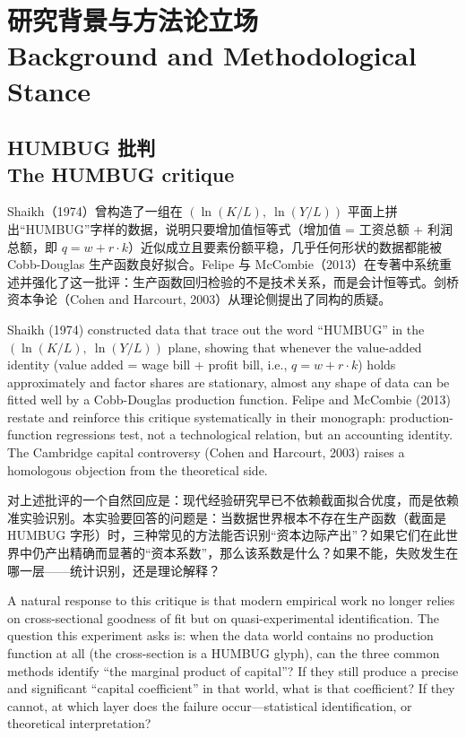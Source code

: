 \documentclass[12pt,a4paper]{ctexart}
\begin{document}
\section[研究背景与方法论立场]{研究背景与方法论立场\\[2pt]\normalsize Background and Methodological Stance}

\subsection[HUMBUG 批判]{HUMBUG 批判\\[1pt]\normalsize The HUMBUG critique}

Shaikh（1974）曾构造了一组在 $(\ln(K/L),\ \ln(Y/L))$ 平面上拼出“HUMBUG”字样的数据，说明只要增加值恒等式（增加值 = 工资总额 + 利润总额，即 $q = w + r\cdot k$）近似成立且要素份额平稳，几乎任何形状的数据都能被 Cobb-Douglas 生产函数良好拟合。Felipe 与 McCombie（2013）在专著中系统重述并强化了这一批评：生产函数回归检验的不是技术关系，而是会计恒等式。剑桥资本争论（Cohen and Harcourt, 2003）从理论侧提出了同构的质疑。

Shaikh (1974) constructed data that trace out the word “HUMBUG” in the $(\ln(K/L),\ \ln(Y/L))$ plane, showing that whenever the value-added identity (value added = wage bill + profit bill, i.e., $q = w + r\cdot k$) holds approximately and factor shares are stationary, almost any shape of data can be fitted well by a Cobb-Douglas production function. Felipe and McCombie (2013) restate and reinforce this critique systematically in their monograph: production-function regressions test, not a technological relation, but an accounting identity. The Cambridge capital controversy (Cohen and Harcourt, 2003) raises a homologous objection from the theoretical side.

对上述批评的一个自然回应是：现代经验研究早已不依赖截面拟合优度，而是依赖准实验识别。本实验要回答的问题是：当数据世界根本不存在生产函数（截面是 HUMBUG 字形）时，三种常见的方法能否识别“资本边际产出”？如果它们在此世界中仍产出精确而显著的“资本系数”，那么该系数是什么？如果不能，失败发生在哪一层——统计识别，还是理论解释？

A natural response to this critique is that modern empirical work no longer relies on cross-sectional goodness of fit but on quasi-experimental identification. The question this experiment asks is: when the data world contains no production function at all (the cross-section is a HUMBUG glyph), can the three common methods identify “the marginal product of capital”? If they still produce a precise and significant “capital coefficient” in that world, what is that coefficient? If they cannot, at which layer does the failure occur—statistical identification, or theoretical interpretation?
\end{document}
